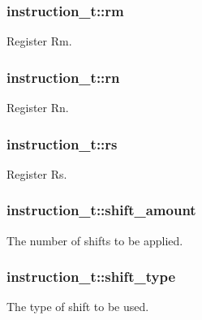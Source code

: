 \subsubsection[{\texorpdfstring{rm}{rm}}]{ instruction\+\_\+t\+::rm}\hypertarget{structinstruction__t_aeff2b2015b47eb6c511d57c058435fb3}{}\label{structinstruction__t_aeff2b2015b47eb6c511d57c058435fb3}
Register Rm. 
\subsubsection[{\texorpdfstring{rn}{rn}}]{ instruction\+\_\+t\+::rn}\hypertarget{structinstruction__t_a5ecf8ae8f3708affd90f22df5af80881}{}\label{structinstruction__t_a5ecf8ae8f3708affd90f22df5af80881}
Register Rn. 
\subsubsection[{\texorpdfstring{rs}{rs}}]{ instruction\+\_\+t\+::rs}\hypertarget{structinstruction__t_a221c733fee7743d19a2468541eb3a6f2}{}\label{structinstruction__t_a221c733fee7743d19a2468541eb3a6f2}
Register Rs. 
\subsubsection[{\texorpdfstring{shift\+\_\+amount}{shift_amount}}]{ instruction\+\_\+t\+::shift\+\_\+amount}\hypertarget{structinstruction__t_ac6da93636b5b619f0ee7c5405b185e5d}{}\label{structinstruction__t_ac6da93636b5b619f0ee7c5405b185e5d}
The number of shifts to be applied. 
\subsubsection[{\texorpdfstring{shift\+\_\+type}{shift_type}}]{ instruction\+\_\+t\+::shift\+\_\+type}\hypertarget{structinstruction__t_a13483a9191b2197c4ed899f3889ad801}{}\label{structinstruction__t_a13483a9191b2197c4ed899f3889ad801}
The type of shift to be used. 
